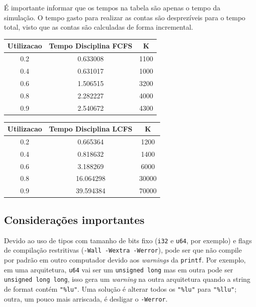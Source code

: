 \documentclass[a4paper]{article}
\newcommand{\inlcode}{\texttt}
\begin{document}
É importante informar que os tempos na tabela são apenas o tempo da simulação. O tempo gasto para realizar as contas são desprezíveis para o tempo total, visto que as contas são calculadas de forma incremental.

\begin{center} \begin{tabular}{|c|c|c|}
    \hline
    Utilizacao & Tempo Disciplina FCFS & K \\
    \hline
    0.2 & 0.633008 & 1100 \\
    \hline
    0.4 & 0.631017 & 1000 \\
    \hline
    0.6 & 1.506515 & 3200 \\
    \hline
    0.8 & 2.282227 & 4000 \\
    \hline
    0.9 & 2.540672 & 4300 \\
    \hline
\end{tabular} \end{center}

\begin{center} \begin{tabular}{|c|c|c|}
    \hline
    Utilizacao & Tempo Disciplina LCFS & K \\
    \hline
    0.2 & 0.665364 & 1200 \\
    \hline
    0.4 & 0.818632 & 1400 \\
    \hline
    0.6 &  3.188269 & 6000 \\
    \hline
    0.8 & 16.064298 & 30000 \\
    \hline
    0.9 & 39.594384 & 70000 \\
    \hline
\end{tabular} \end{center}

\subsection{Considerações importantes}

Devido ao uso de tipos com tamanho de bits fixo
(\inlcode{i32} e \inlcode{u64}, por exemplo)
e flags de compilação restritivas (\inlcode{-Wall -Wextra -Werror}),
pode ser que não compile por padrão em outro computador
devido aos \emph{warnings} da \inlcode{printf}.
Por exemplo, em uma arquitetura,
\inlcode{u64} vai ser um \inlcode{unsigned long}
mas em outra pode ser \inlcode{unsigned long long},
isso gera um \emph{warning} na outra arquitetura
quando a string de format contém \verb."%lu"..
Uma solução é alterar todos os
\verb."%lu". para \verb."%llu".;
outra, um pouco mais arriscada,
é desligar o \inlcode{-Werror}.
\end{document}
